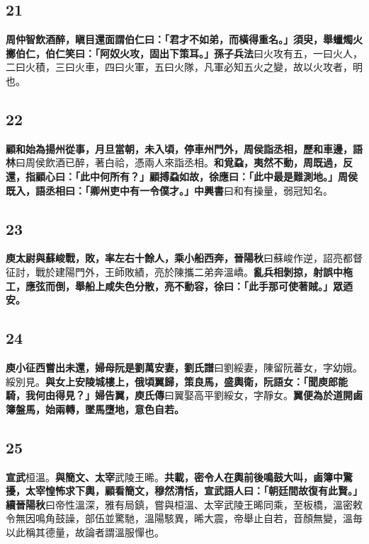 \subsection*{21}

\textbf{周仲智飲酒醉，瞋目還面謂伯仁曰：「君才不如弟，而橫得重名。」須臾，舉蠟燭火擲伯仁，伯仁笑曰：「阿奴火攻，固出下策耳。」}{\footnotesize \textbf{孫子兵法}曰火攻有五，一曰火人，二曰火積，三曰火車，四曰火軍，五曰火隊，凡軍必知五火之變，故以火攻者，明也。}

\subsection*{22}

\textbf{顧和始為揚州從事，月旦當朝，未入頃，停車州門外，周侯詣丞相，歷和車邊，}{\footnotesize \textbf{語林}曰周侯飲酒已醉，著白祫，憑兩人來詣丞相。}\textbf{和覓蝨，夷然不動，周既過，反還，指顧心曰：「此中何所有？」顧搏蝨如故，徐應曰：「此中最是難測地。」周侯既入，語丞相曰：「卿州吏中有一令僕才。」}{\footnotesize \textbf{中興書}曰和有操量，弱冠知名。}

\subsection*{23}

\textbf{庾太尉與蘇峻戰，敗，率左右十餘人，乘小船西奔，}{\footnotesize \textbf{晉陽秋}曰蘇峻作逆，詔亮都督征討，戰於建陽門外，王師敗績，亮於陳攜二弟奔溫嶠。}\textbf{亂兵相剝掠，射誤中柂工，應弦而倒，舉船上咸失色分散，亮不動容，徐曰：「此手那可使著賊。」眾迺安。}

\subsection*{24}

\textbf{庾小征西嘗出未還，婦母阮是劉萬安妻，}{\footnotesize \textbf{劉氏譜}曰劉綏妻，陳留阮蕃女，字幼娥。綏別見。}\textbf{與女上安陵城樓上，俄頃翼歸，策良馬，盛輿衛，阮語女：「聞庾郎能騎，我何由得見？」婦告翼，}{\footnotesize \textbf{庾氏傳}曰翼娶高平劉綏女，字靜女。}\textbf{翼便為於道開鹵簿盤馬，始兩轉，墜馬墮地，意色自若。}

\subsection*{25}

\textbf{宣武}{\footnotesize 桓溫。}\textbf{與簡文、太宰}{\footnotesize 武陵王晞。}\textbf{共載，密令人在輿前後鳴鼓大叫，鹵簿中驚擾，太宰惶怖求下輿，顧看簡文，穆然清恬，宣武語人曰：「朝廷間故復有此賢。」}{\footnotesize \textbf{續晉陽秋}曰帝性溫深，雅有局鎮，嘗與桓溫、太宰武陵王晞同乘，至板橋，溫密敕令無因鳴角鼓譟，部伍並驚馳，溫陽駭異，晞大震，帝舉止自若，音顏無變，溫毎以此稱其德量，故論者謂溫服憚也。}

